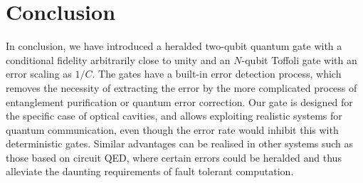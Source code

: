 \section{Conclusion}

In conclusion, we have introduced a heralded two-qubit quantum
gate with a conditional fidelity arbitrarily close to unity and an $N$-qubit Toffoli gate
with an error scaling as $1/C$. The gates have a
built-in error detection process, which removes the necessity of extracting the
error by the more complicated process of entanglement purification or quantum
error correction. Our gate is designed for the specific case of optical
cavities, and allows exploiting realistic systems for quantum communication, even though the error rate would inhibit this with deterministic gates. Similar
advantages can be realised in other systems such as those based on circuit QED, where certain errors could be
heralded and thus alleviate the daunting requirements of fault tolerant
computation. 
